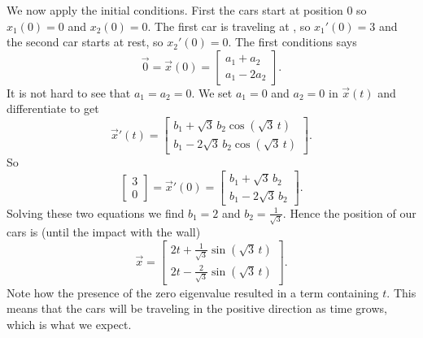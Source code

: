 \documentclass{ximera}
\begin{document}
\begin{exampleSol}
    We now apply the initial conditions.  First the cars start at position 0 so $x_1 (0) = 0$ and $x_2(0) = 0$.  The first car is traveling at , so $x_1'(0) = 3$ and the second car starts at rest, so $x_2'(0) = 0$. The first conditions says
    \begin{equation*}
        \vec{0} = \vec{x}(0) = 
        \begin{bmatrix}
            a_1 + a_2 \\
            a_1 - 2 a_2 
        \end{bmatrix} .
    \end{equation*}
    It is not hard to see that $a_1 = a_2 = 0$.  We set $a_1=0$ and $a_2=0$ in $\vec{x}(t)$ and differentiate to get
    \begin{equation*}
        {\vec{x}}'(t) =
        \begin{bmatrix}
            b_1 + \sqrt{3} \, b_2 \cos ( \sqrt{3} \, t ) \\
            b_1 - 2 \sqrt{3} \, b_2 \cos ( \sqrt{3} \, t )
        \end{bmatrix} .
    \end{equation*}
    So
    \begin{equation*}
        \begin{bmatrix} 
            3 \\ 
            0 
        \end{bmatrix} 
        =  {\vec{x}}'(0) =
        \begin{bmatrix}
            b_1 + \sqrt{3} \, b_2 \\
            b_1 - 2 \sqrt{3} \, b_2 
        \end{bmatrix} .
    \end{equation*}
    Solving these two equations we find $b_1 = 2$ and $b_2 = \frac{1}{\sqrt{3}}$.  Hence the position of our cars is (until the impact with the wall)
    \begin{equation*}
        \vec{x} = 
        \begin{bmatrix}
            2 t + \frac{1}{\sqrt{3}} \sin ( \sqrt{3} \, t ) \\
            2 t - \frac{2}{\sqrt{3}} \sin ( \sqrt{3} \, t )
        \end{bmatrix} .
    \end{equation*}
    Note how the presence of the zero eigenvalue resulted in a term containing $t$. This means that the cars will be traveling in the positive direction as time grows, which is what we expect.
    

\end{exampleSol}
\end{document}
